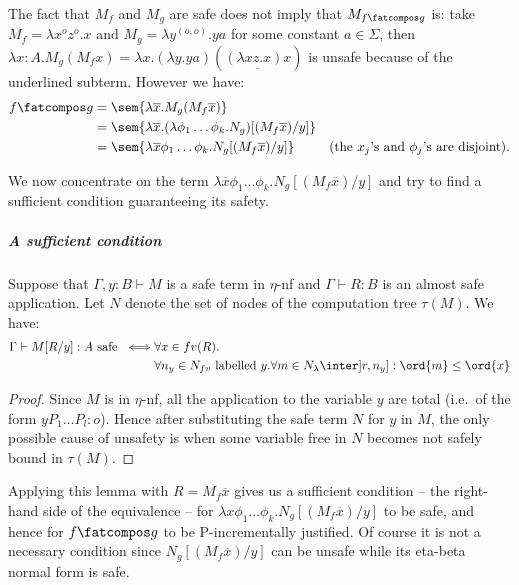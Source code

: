 The fact that $M_f$ and $M_g$ are safe does not imply that $M_{f\fatcompos g}$ is: take $M_f = \lambda x^o z^o.x$ and $M_g = \lambda y^{(o,o)} . y a$ for some constant $a\in \Sigma$, then $\lambda x:A . M_g (M_f x) = \lambda x . (\lambda y . y a) ( \underline{(\lambda x z.x) x} )$ is unsafe because of the underlined subterm. However we have:
\begin{align*}
f\fatcompos g &= \sem{\lambda \overline{x} . M_g (M_f  \overline{x})} \\
 &= \sem{\lambda \overline{x} . (\lambda \phi_1\ldots \phi_k . N_g) [(M_f \overline{x}) / y]} \\
&= \sem{\lambda \overline{x} \phi_1 \dots \phi_k. N_g [(M_f  \overline{x}) / y]}
& \mbox{(the $x_j$'s and $\phi_j$'s are disjoint)}.
\end{align*}

We now concentrate on the term  $\lambda \overline{x} \phi_1 \dots
\phi_k. N_g [(M_f  \overline{x}) / y]$ and try to find a sufficient
condition guaranteeing its safety.

\subparagraph{A sufficient condition}
\begin{lemma}
Suppose that $\Gamma,y:B \vdash M$ is a safe term in $\eta$-nf and $\Gamma \vdash R : B$ is an almost safe application. Let $N$ denote the set of nodes of the computation tree $\tau(M)$. We have:
\begin{align*}
\Gamma \vdash M[R/y] :A \mbox{ safe }
\iff&  \forall x \in fv(R) . \\
    & \forall n_y \in N_{fv} \mbox{ labelled $y$}.
      \forall m \in N_{\lambda} \inter ]r,n_y] : \ord{m} \leq \ord{x}
\end{align*}
\end{lemma}
\begin{proof}
Since $M$ is in $\eta$-nf, all the application to the variable $y$ are total (i.e.~of the form $y P_1 \ldots P_l :o$). Hence after substituting the safe term $N$ for $y$ in $M$, the only possible cause of unsafety is when
some variable free in $N$ becomes not safely bound in $\tau(M)$.
\end{proof}

Applying this lemma with $R= M_f \overline{x}$ gives us a sufficient
condition -- the right-hand side of the equivalence -- for $\lambda
x \phi_1 \dots \phi_k. N_g [(M_f \overline{x}) / y]$ to be safe, and
hence for $f\fatcompos g$ to be P-incrementally justified. Of course
it is not a necessary condition since $N_g[(M_f \overline{x}) /y]$
can be unsafe while its eta-beta normal form is safe.

